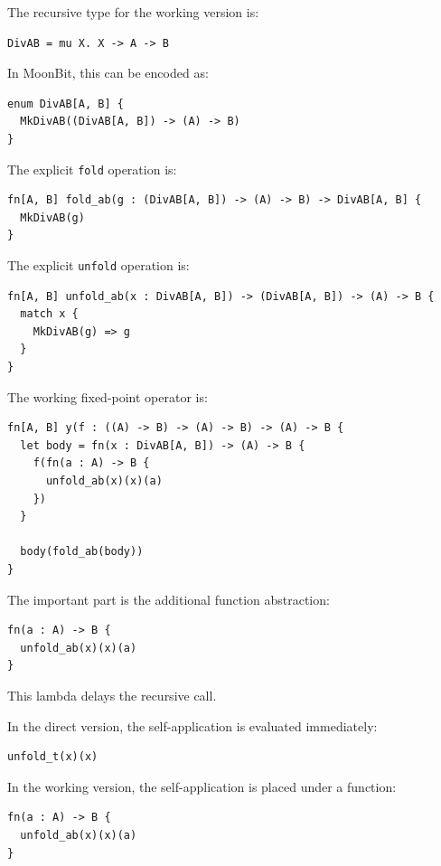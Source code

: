\documentclass[manuscript]{acmart}
\begin{document}
The recursive type for the working version is:

\begin{lstlisting}
DivAB = mu X. X -> A -> B
\end{lstlisting}

In MoonBit, this can be encoded as:

\begin{lstlisting}
enum DivAB[A, B] {
  MkDivAB((DivAB[A, B]) -> (A) -> B)
}
\end{lstlisting}

The explicit \texttt{fold} operation is:

\begin{lstlisting}
fn[A, B] fold_ab(g : (DivAB[A, B]) -> (A) -> B) -> DivAB[A, B] {
  MkDivAB(g)
}
\end{lstlisting}

The explicit \texttt{unfold} operation is:

\begin{lstlisting}
fn[A, B] unfold_ab(x : DivAB[A, B]) -> (DivAB[A, B]) -> (A) -> B {
  match x {
    MkDivAB(g) => g
  }
}
\end{lstlisting}

The working fixed-point operator is:

\begin{lstlisting}
fn[A, B] y(f : ((A) -> B) -> (A) -> B) -> (A) -> B {
  let body = fn(x : DivAB[A, B]) -> (A) -> B {
    f(fn(a : A) -> B {
      unfold_ab(x)(x)(a)
    })
  }

  body(fold_ab(body))
}
\end{lstlisting}

The important part is the additional function abstraction:

\begin{lstlisting}
fn(a : A) -> B {
  unfold_ab(x)(x)(a)
}
\end{lstlisting}

This lambda delays the recursive call.

In the direct version, the self-application is evaluated immediately:

\begin{lstlisting}
unfold_t(x)(x)
\end{lstlisting}

In the working version, the self-application is placed under a function:

\begin{lstlisting}
fn(a : A) -> B {
  unfold_ab(x)(x)(a)
}
\end{lstlisting}
\end{document}
